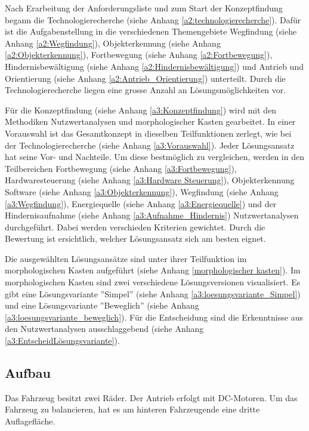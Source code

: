 \documentclass[../main.tex]{subfiles}
\begin{document}
Nach Erarbeitung der Anforderungsliste und zum Start der Konzeptfindung begann die Technologierecherche (siehe Anhang \ref{a2:technologierecherche}). Dafür ist die Aufgabenstellung in die verschiedenen Themengebiete Wegfindung (siehe Anhang \ref{a2:Wegfindung}), Objekterkennung (siehe Anhang \ref{a2:Objekterkennung}), Fortbewegung (siehe Anhang \ref{a2:Fortbewegung}), Hindernisbewältigung (siehe Anhang \ref{a2:Hindernisbewältigung}) und Antrieb und Orientierung (siehe Anhang \ref{a2:Antrieb_Orientierung}) unterteilt. Durch die Technologierecherche liegen eine grosse Anzahl an Lösungsmöglichkeiten vor. 

Für die Konzeptfindung (siehe Anhang \ref{a3:Konzeptfindung}) wird mit den Methodiken Nutzwertanalysen und morphologischer Kasten gearbeitet. In einer Vorauswahl ist das Gesamtkonzept in dieselben Teilfunktionen zerlegt, wie bei der Technologierecherche (siehe Anhang \ref{a3:Vorauswahl}). Jeder Lösungsansatz hat seine Vor- und Nachteile. Um diese bestmöglich zu vergleichen, werden in den Teilbereichen Fortbewegung (siehe Anhang \ref{a3:Fortbewegung}), Hardwaresteuerung (siehe Anhang \ref{a3:Hardware Steuerung}), Objekterkennung Software (siehe Anhang \ref{a3:Objekterkennung}), Wegfindung (siehe Anhang \ref{a3:Wegfindung}), Energiequelle (siehe Anhang \ref{a3:Energiequelle}) und der Hindernisaufnahme (siehe Anhang \ref{a3:Aufnahme_Hindernis}) Nutzwertanalysen durchgeführt. Dabei werden verschieden Kriterien gewichtet. Durch die Bewertung ist ersichtlich, welcher Lösungsansatz sich am besten eignet.

Die ausgewählten Lösungsansätze sind unter ihrer Teilfunktion im morphologischen Kasten aufgeführt (siehe Anhang \ref{morphologischer kasten}). Im morphologischen Kasten sind zwei verschiedene Lösungsversionen visualisiert. Es gibt eine Lösungsvariante ''Simpel'' (siehe Anhang \ref{a3:loesungsvariante_Simpel}) und eine Lösungsvariante ''Beweglich'' (siehe Anhang \ref{a3:loesungsvariante_beweglich}). Für die Entscheidung sind die Erkenntnisse aus den Nutzwertanalysen ausschlaggebend (siehe Anhang \ref{a3:EntscheidLösungsvariante}).
\newpage

\subsection{Aufbau}

Das Fahrzeug besitzt zwei Räder. Der Antrieb erfolgt mit DC-Motoren. Um das Fahrzeug zu balancieren, hat es am hinteren Fahrzeugende eine dritte Auflagefläche.
\end{document}
